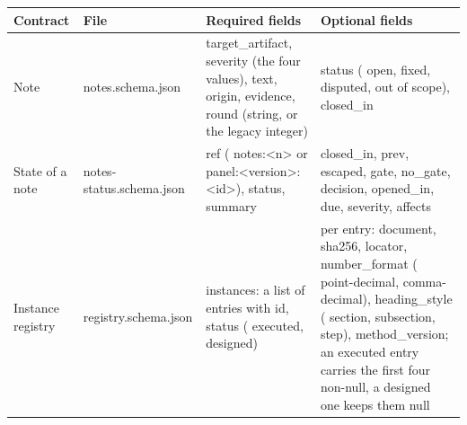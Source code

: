 \documentclass[
  american,
  10pt,
]{report}
\newcounter{none} %
\renewcommand{\texttt}[1]{{\ttfamily\hyphenchar\font=-1 #1}}
\begin{document}
{\def\LTcaptype{none} %
\begin{longtable}[]{@{}
  >{\raggedright\arraybackslash}p{}
  >{\raggedright\arraybackslash}p{}
  >{\raggedright\arraybackslash}p{}
  >{\raggedright\arraybackslash}p{}@{}}
\toprule\noalign{}
\begin{minipage}[b]{\linewidth}\raggedright
Contract
\end{minipage} & \begin{minipage}[b]{\linewidth}\raggedright
File
\end{minipage} & \begin{minipage}[b]{\linewidth}\raggedright
Required fields
\end{minipage} & \begin{minipage}[b]{\linewidth}\raggedright
Optional fields
\end{minipage} \\
\midrule\noalign{}
\endhead
\bottomrule\noalign{}
\endlastfoot
Note & \texttt{notes.\allowbreak{}schema.\allowbreak{}json} &
\texttt{target\_\allowbreak{}artifact}, \texttt{severity} (the four
values), \texttt{text}, \texttt{origin}, \texttt{evidence},
\texttt{round} (string, or the legacy integer) & \texttt{status}
(\texttt{open}, \texttt{fixed}, \texttt{disputed},
\texttt{out of scope}), \texttt{closed\_\allowbreak{}in} \\
State of a note &
\texttt{notes-\allowbreak{}status.\allowbreak{}schema.\allowbreak{}json}
& \texttt{ref} (\texttt{notes:\allowbreak{}<n>} or
\texttt{panel:\allowbreak{}<version>:\allowbreak{}<id>}),
\texttt{status}, \texttt{summary} & \texttt{closed\_\allowbreak{}in},
\texttt{prev}, \texttt{escaped}, \texttt{gate},
\texttt{no\_\allowbreak{}gate}, \texttt{decision},
\texttt{opened\_\allowbreak{}in}, \texttt{due}, \texttt{severity},
\texttt{affects} \\
Instance registry &
\texttt{registry.\allowbreak{}schema.\allowbreak{}json} &
\texttt{instances}: a list of entries with \texttt{id}, \texttt{status}
(\texttt{executed}, \texttt{designed}) & per entry: \texttt{document},
\texttt{sha256}, \texttt{locator}, \texttt{number\_\allowbreak{}format}
(\texttt{point-\allowbreak{}decimal},
\texttt{comma-\allowbreak{}decimal}),
\texttt{heading\_\allowbreak{}style} (\texttt{section},
\texttt{subsection}, \texttt{step}),
\texttt{method\_\allowbreak{}version}; an executed entry carries the
first four non-null, a designed one keeps them null \\

\end{longtable}}
\end{document}
